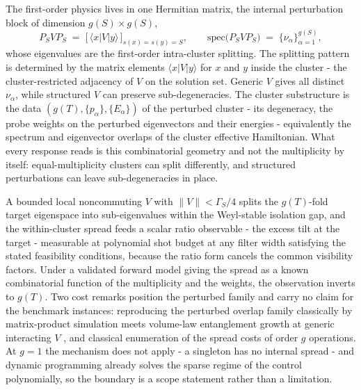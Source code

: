 The first-order physics lives in one Hermitian matrix, the internal perturbation block of dimension $g(S) \times g(S)$,
\begin{equation}\label{def:internal-perturbation-block}
P_S V P_S \;=\; \bigl[\, \langle x | V | y \rangle \,\bigr]_{s(x) = s(y) = S}, \qquad \mathrm{spec}\bigl(P_S V P_S\bigr) \;=\; \{\nu_\alpha\}_{\alpha=1}^{g(S)},
\end{equation}
whose eigenvalues are the first-order intra-cluster splitting. The splitting pattern is determined by the matrix elements $\langle x|V|y\rangle$ for $x$ and $y$ inside the cluster - the cluster-restricted adjacency of $V$ on the solution set. Generic $V$ gives all distinct $\nu_\alpha$, while structured $V$ can preserve sub-degeneracies. The cluster substructure is the data $(g(T), \{p_\alpha\}, \{E_\alpha\})$ of the perturbed cluster - its degeneracy, the probe weights on the perturbed eigenvectors and their energies - equivalently the spectrum and eigenvector overlaps of the cluster effective Hamiltonian. What every response reads is this combinatorial geometry and not the multiplicity by itself: equal-multiplicity clusters can split differently, and structured perturbations can leave sub-degeneracies in place.

A bounded local noncommuting $V$ with $\|V\| < \Gamma_S/4$ splits the $g(T)$-fold target eigenspace into sub-eigenvalues within the Weyl-stable isolation gap, and the within-cluster spread feeds a scalar ratio observable - the excess tilt at the target - measurable at polynomial shot budget at any filter width satisfying the stated feasibility conditions, because the ratio form cancels the common visibility factors. Under a validated forward model giving the spread as a known combinatorial function of the multiplicity and the weights, the observation inverts to $g(T)$. Two cost remarks position the perturbed family and carry no claim for the benchmark instances: reproducing the perturbed overlap family classically by matrix-product simulation meets volume-law entanglement growth at generic interacting $V$ \cite{calabrese2005evolution,eisert2010area,schollwock2011density,pal2010mbl}, and classical enumeration of the spread costs of order $g$ operations. At $g = 1$ the mechanism does not apply - a singleton has no internal spread - and dynamic programming already solves the sparse regime of the control polynomially, so the boundary is a scope statement rather than a limitation.

